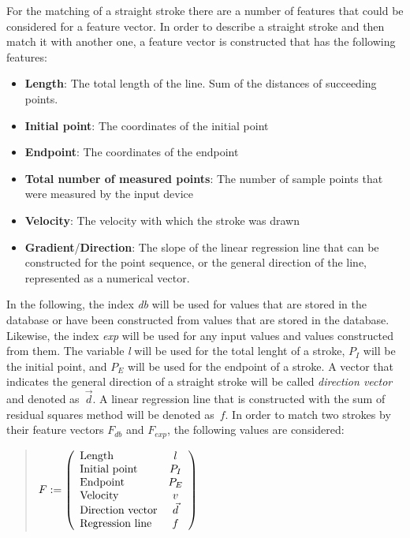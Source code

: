 For the matching of a straight stroke there are a number of features
that could be considered for a feature vector.
In order to describe a straight stroke and then match it with another one,
a feature vector is constructed that has the following features:
\begin{itemize}
  \item \textbf{Length}: The total length of the line. Sum of the distances of
        succeeding points.
  \item \textbf{Initial point}: The coordinates of the initial point
  \item \textbf{Endpoint}: The coordinates of the endpoint
  \item \textbf{Total number of measured points}: The number of sample
        points that were measured by the input device
  \item \textbf{Velocity}: The velocity with which the stroke was drawn
  \item \textbf{Gradient}/\textbf{Direction}: The slope of the linear 
  regression line that can be constructed for the point sequence, or
  the general direction of the line, represented as a numerical vector.
\end{itemize}
In the following, the index \emph{db} will be used for values that are
stored in the database or have been constructed from values that are stored
in the database. Likewise, the index \emph{exp} will be used for any 
input values and values constructed from them. The variable \emph{l} 
will be used for the total lenght of a stroke, \(P_{I}\) will be the 
initial point, and \(P_{E}\) will be used for the endpoint of a stroke. 
A vector that indicates the general direction of a straight stroke will be 
called \emph{direction vector} and denoted as~\(\vec{d}\). A linear regression 
line that is constructed with the sum of residual squares method 
will be denoted as~\(f\).
In order to match two strokes by their feature vectors \(F_{db} \) 
and \(F_{exp} \), the following values are considered:
\begin{quote}
\(
    F :=
    \left( 
    \begin {array} {l c} 
        \text{Length} & l \\
        \text{Initial point} & P_{I} \\
        \text{Endpoint} & P_{E} \\
        \text{Velocity} & v \\
        \text{Direction vector} & \vec{d} \\
        \text{Regression line} & f \\
    \end {array} 
    \right)
\)
\end{quote}
